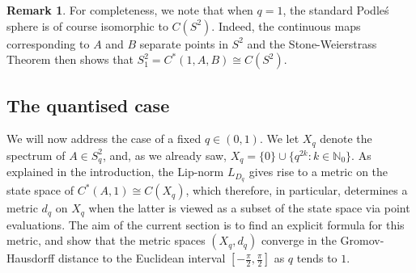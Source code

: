 \documentclass[11pt, reqno, a4paper, final]{amsart}
\theoremstyle{plain}
\newtheorem{proposition}[thm]{Proposition}
\theoremstyle{definition}
\newtheorem{remark}[thm]{Remark}
\newcommand{\NN}{{\mathbb N}}
\newcommand{\black}{\color{black}}
\begin{document}
\begin{remark}
For completeness, we note that when $q=1$, the standard Podle\'s sphere is of course isomorphic to $C(S^2)$. Indeed, {\black the continuous maps corresponding to $A$ and $B$ separate points in $S^2$ and the Stone-Weierstrass Theorem then shows that $S_1^2=C^*(1,A,B) \cong C(S^2)$.}
\end{remark}

\subsection{The quantised case}
We will now address the case of a {\black fixed} $q\in (0,1)$. We let $X_q$ denote the spectrum of $A\in S_q^2$, and, as we already saw,  $X_q=\{0\}\cup \{q^{2k} : k\in \NN_0\}$. As explained in the introduction, the Lip-norm $L_{D_q}$ gives rise to a metric on the state space of $C^*(A,1)\cong C(X_q)$, which therefore, in particular, determines a metric $d_q$ on $X_q$ when the latter is  viewed as a subset of the state space via point {\black evaluations}.
The aim of the current section is to find an explicit formula for this metric, and show that the metric spaces $(X_q,d_q)$ converge in the {\black Gromov-Hausdorff} distance to the Euclidean interval $[-\tfrac{\pi}{2},\tfrac{\pi}{2}]$ as $q$ tends to $1$. 
\end{document}
